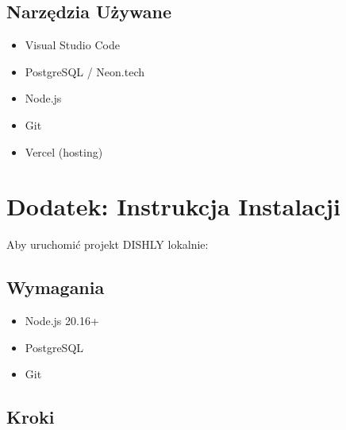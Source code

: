 ﻿\documentclass[12pt,a4paper,utf-8]{article}
\begin{document}
\subsection{Narzędzia Używane}

\begin{itemize}
    \item Visual Studio Code
    \item PostgreSQL / Neon.tech
    \item Node.js
    \item Git
    \item Vercel (hosting)
\end{itemize}

\newpage

\section{Dodatek: Instrukcja Instalacji}

Aby uruchomić projekt DISHLY lokalnie:

\subsection{Wymagania}

\begin{itemize}
    \item Node.js 20.16+
    \item PostgreSQL
    \item Git
\end{itemize}

\subsection{Kroki}
\end{document}
